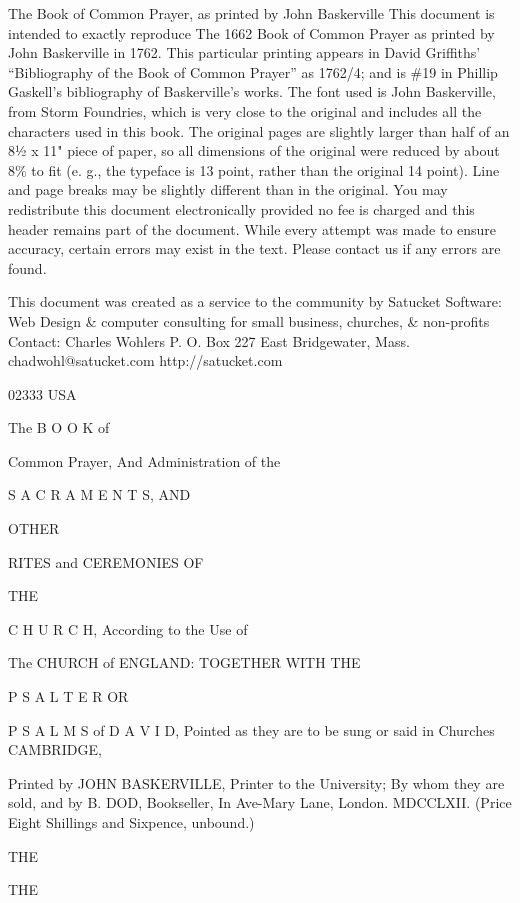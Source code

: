 
The Book of Common Prayer, as printed by John Baskerville This document is intended to exactly reproduce The 1662 Book of Common Prayer as printed by John Baskerville in 1762. This particular printing appears in David Griffiths' “Bibliography of the Book of Common Prayer” as 1762/4; and is \#19 in Phillip Gaskell's bibliography of Baskerville's works. The font used is John Baskerville, from Storm Foundries, which is very close to the original and includes all the characters used in this book. The original pages are slightly larger than half of an 8½ x 11" piece of paper, so all dimensions of the original were reduced by about 8\% to fit (e. g., the typeface is 13 point, rather than the original 14 point). Line and page breaks may be slightly different than in the original. You may redistribute this document electronically provided no fee is charged and this header remains part of the document. While every attempt was made to ensure accuracy, certain errors may exist in the text. Please contact us if any errors are found.

This document was created as a service to the community by Satucket Software: Web Design \& computer consulting for small business, churches, \& non-profits Contact: Charles Wohlers P. O. Box 227 East Bridgewater, Mass. chadwohl@satucket.com http://satucket.com

02333 USA

The B O O K of

Common Prayer, And Administration of the

S A C R A M E N T S, AND

OTHER

RITES and CEREMONIES OF

THE

C H U R C H, According to the Use of

The CHURCH of ENGLAND: TOGETHER WITH THE

P S A L T E R OR

P S A L M S of D A V I D, Pointed as they are to be sung or said in Churches CAMBRIDGE,

Printed by JOHN BASKERVILLE, Printer to the University; By whom they are sold, and by B. DOD, Bookseller, In Ave-Mary Lane, London. MDCCLXII. (Price Eight Shillings and Sixpence, unbound.)

THE

THE

